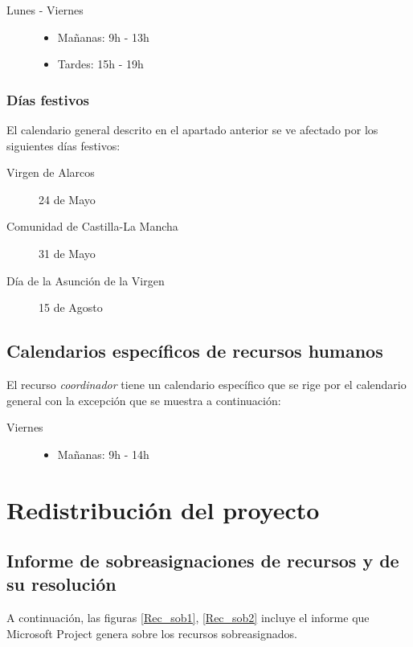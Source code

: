 \documentclass[11pt,a4paper,spanish,twoside]{book}
\begin{document}
\begin{description}
\item[Lunes - Viernes] \hfill
  \begin{itemize}
  \item Mañanas: 9h - 13h
  \item Tardes: 15h - 19h
  \end{itemize}
\end{description}

\subsection{Días festivos}
El calendario general descrito en el apartado anterior se ve afectado por los
siguientes días festivos:

\begin{description}
\item[Virgen de Alarcos] 24 de Mayo
\item[Comunidad de Castilla-La Mancha] 31 de Mayo
\item[Día de la Asunción de la Virgen] 15 de Agosto
\end{description}

\section{Calendarios específicos de recursos humanos}
El recurso \emph{coordinador} tiene un calendario específico que se rige por
el calendario general con la excepción que se muestra a continuación:

\begin{description}
\item[Viernes] \hfill
  \begin{itemize}
  \item Mañanas: 9h - 14h
  \end{itemize}
\end{description}


\chapter{Redistribución del proyecto}
\newpage
\section[Informe de sobreasignaciones]
{Informe de sobreasignaciones de recursos y de su resolución}
A continuación, las figuras \ref{Rec_sob1}, \ref{Rec_sob2} incluye el
informe que Microsoft Project genera sobre los recursos sobreasignados.
\end{document}
